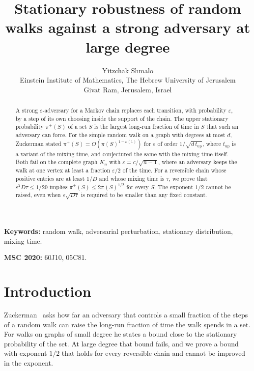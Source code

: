 \documentclass[11pt]{article}
\title{Stationary robustness of random walks against a strong adversary at large degree}
\author{Yitzchak Shmalo\\
Einstein Institute of Mathematics, The Hebrew University of Jerusalem\\
Givat Ram, Jerusalem, Israel}
\date{}
\theoremstyle{remark}
\theoremstyle{plain}
\newcommand{\tup}{t_{\mathrm{up}}}
\begin{document}
\maketitle

\begin{abstract}
A strong $\varepsilon$-adversary for a Markov chain replaces each transition, with probability $\varepsilon$, by a step
of its own choosing inside the support of the chain. The upper stationary probability $\pi^+(S)$ of a set $S$ is the
largest long-run fraction of time in $S$ that such an adversary can force. For the simple random walk on a graph
with degrees at most $d$, Zuckerman stated $\pi^+(S)=O(\pi(S)^{1-o(1)})$ for $\varepsilon$ of order
$1/\sqrt{d\,\tup}$, where $\tup$ is a variant of the mixing time, and conjectured the same with the mixing time
itself. Both fail on the complete graph $K_n$ with $\varepsilon=c/\sqrt{n-1}$, where an adversary keeps the walk at
one vertex at least a fraction $\varepsilon/2$ of the time. For a reversible chain whose positive entries are at
least $1/D$ and whose mixing time is $\tau$, we prove that $\varepsilon^2D\tau\le1/20$ implies
$\pi^+(S)\le2\pi(S)^{1/2}$ for every $S$. The exponent $1/2$ cannot be raised, even when $\varepsilon\sqrt{D\tau}$
is required to be smaller than any fixed constant.
\end{abstract}

\noindent\textbf{Keywords:} random walk, adversarial perturbation, stationary distribution, mixing time.

\noindent\textbf{MSC 2020:} 60J10, 05C81.

\section{Introduction}\label{sec:intro}

Zuckerman~\cite{Zu} asks how far an adversary that controls a small fraction of the steps of a random walk can raise
the long-run fraction of time the walk spends in a set. For walks on graphs of small degree he states a bound close to
the stationary probability of the set. At large degree that bound fails, and we prove a bound with exponent $1/2$
that holds for every reversible chain and cannot be improved in the exponent.
\end{document}

